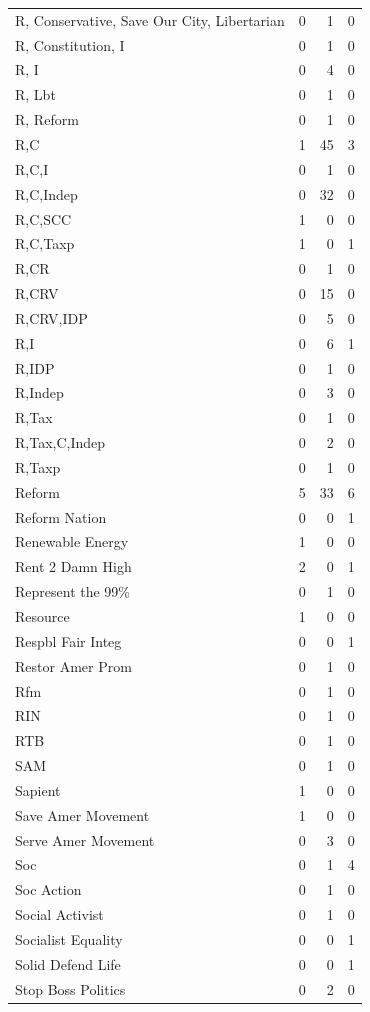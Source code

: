 \begin{supertabular}{lrrr}
R, Conservative, Save Our City, Libertarian & 0 & 1 & 0\\
R, Constitution, I & 0 & 1 & 0\\
R, I & 0 & 4 & 0\\
R, Lbt & 0 & 1 & 0\\
R, Reform & 0 & 1 & 0\\
R,C & 1 & 45 & 3\\
R,C,I & 0 & 1 & 0\\
R,C,Indep & 0 & 32 & 0\\
R,C,SCC & 1 & 0 & 0\\
R,C,Taxp & 1 & 0 & 1\\
R,CR & 0 & 1 & 0\\
R,CRV & 0 & 15 & 0\\
R,CRV,IDP & 0 & 5 & 0\\
R,I & 0 & 6 & 1\\
R,IDP & 0 & 1 & 0\\
R,Indep & 0 & 3 & 0\\
R,Tax & 0 & 1 & 0\\
R,Tax,C,Indep & 0 & 2 & 0\\
R,Taxp & 0 & 1 & 0\\
Reform & 5 & 33 & 6\\
Reform Nation & 0 & 0 & 1\\
Renewable Energy & 1 & 0 & 0\\
Rent 2 Damn High & 2 & 0 & 1\\
Represent the 99\% & 0 & 1 & 0\\
Resource & 1 & 0 & 0\\
Respbl Fair Integ & 0 & 0 & 1\\
Restor Amer Prom & 0 & 1 & 0\\
Rfm & 0 & 1 & 0\\
RIN & 0 & 1 & 0\\
RTB & 0 & 1 & 0\\
SAM & 0 & 1 & 0\\
Sapient & 1 & 0 & 0\\
Save Amer Movement & 1 & 0 & 0\\
Serve Amer Movement & 0 & 3 & 0\\
Soc & 0 & 1 & 4\\
Soc Action & 0 & 1 & 0\\
Social Activist & 0 & 1 & 0\\
Socialist Equality & 0 & 0 & 1\\
Solid Defend Life & 0 & 0 & 1\\
Stop Boss Politics & 0 & 2 & 0\\

\end{supertabular}
